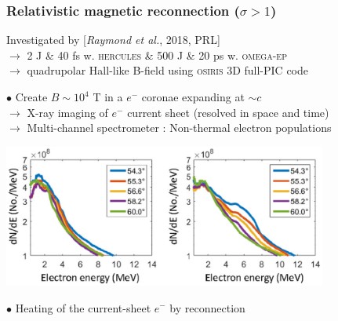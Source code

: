 \documentclass{beamer}
\begin{document}
\begin{frame}
\frametitle{Relativistic magnetic reconnection ($\sigma > 1$)}

Investigated by [\textit{Raymond et al.}, 2018, PRL] \\
$\to$ 2 J \& 40 fs w. \textsc{hercules} \& 500 J \& 20 ps w. \textsc{omega-ep} \\
$\to$ quadrupolar Hall-like B-field using \textsc{osiris} 3D full-PIC code \\

\smallskip

$\bullet$ Create $B \sim 10^4$ T in a $e^-$ coronae expanding at $\sim c$ \\

$\to$ X-ray imaging of  $e^-$ current sheet (resolved in space and time) \\
$\to$ Multi-channel spectrometer : Non-thermal electron populations \\

\begin{center}
\includegraphics[width=0.8\textwidth]{raymond2018.png}
\end{center}

$\bullet$ Heating of the current-sheet $e^-$ by reconnection

\end{frame}
\end{document}

